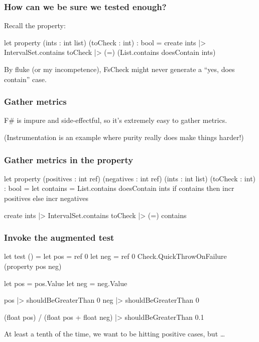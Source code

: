 \documentclass{beamer}
\begin{document}
\begin{frame}[fragile]
\frametitle{How can we be sure we tested enough?}

Recall the property:
\begin{fslisting}
let property (ints : int list) (toCheck : int) : bool =
    create ints
    |> IntervalSet.contains toCheck
    |> (=) (List.contains doesContain ints)

\end{fslisting}

\pause
By fluke (or my incompetence), FsCheck might never generate a ``yes, does contain'' case.
\end{frame}

\begin{frame}
\frametitle{Gather metrics}
F\# is impure and side-effectful, so it's extremely easy to gather metrics.

\hfill \break

(Instrumentation is an example where purity really does make things harder!)
\end{frame}

\begin{frame}[fragile]
\frametitle{Gather metrics in the property}
\begin{fslisting}
let property
    (positives : int ref) (negatives : int ref)
    (ints : int list)
    (toCheck : int)
    : bool
    =
    let contains = List.contains doesContain ints
    if contains then
        incr positives
    else
        incr negatives

    create ints
    |> IntervalSet.contains toCheck
    |> (=) contains
\end{fslisting}
\end{frame}

\begin{frame}[fragile]
\frametitle{Invoke the augmented test}
\begin{fslisting}
[<Test>]
let test () =
    let pos = ref 0
    let neg = ref 0
    Check.QuickThrowOnFailure (property pos neg)

    let pos = pos.Value
    let neg = neg.Value

    pos |> shouldBeGreaterThan 0
    neg |> shouldBeGreaterThan 0

    (float pos) / (float pos + float neg)
    |> shouldBeGreaterThan 0.1
\end{fslisting}
\end{frame}

\begin{frame}
At least a tenth of the time, we want to be hitting positive cases, but \dots
\end{frame}
\end{document}
